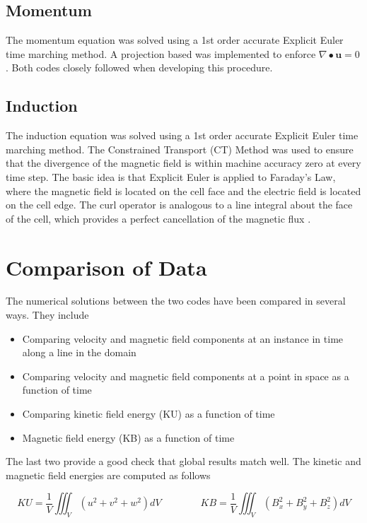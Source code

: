 \documentclass[11pt]{article}
\begin{document}
\subsection{Momentum}
The momentum equation was solved using a 1st order accurate Explicit Euler time marching method. A projection based was implemented to enforce $\nabla \bullet \pmb{u} = 0$. Both codes closely followed \cite{griebel1997numerical} when developing this procedure.

\subsection{Induction}
The induction equation was solved using a 1st order accurate Explicit Euler time marching method. The Constrained Transport (CT) Method was used to ensure that the divergence of the magnetic field is within machine accuracy zero at every time step. The basic idea is that Explicit Euler is applied to Faraday's Law, where the magnetic field is located on the cell face and the electric field is located on the cell edge. The curl operator is analogous to a line integral about the face of the cell, which provides a perfect cancellation of the magnetic flux \cite{Toth2000}.

\section{Comparison of Data}

The numerical solutions between the two codes have been compared in several ways. They include 

\begin{itemize}
\item Comparing velocity and magnetic field components at an instance in time along a line in the domain
\item Comparing velocity and magnetic field components at a point in space as a function of time
\item Comparing kinetic field energy (KU) as a function of time
\item Magnetic field energy (KB) as a function of time
\end{itemize}

The last two provide a good check that global results match well. The kinetic and magnetic field energies are computed as follows

\begin{equation}
	KU = \frac{1}{V} \iiint_{V} (u^2+v^2+w^2) dV
	\qquad \qquad
	KB = \frac{1}{V} \iiint_{V} (B_x^2+B_y^2+B_z^2) dV
\end{equation}
\end{document}
